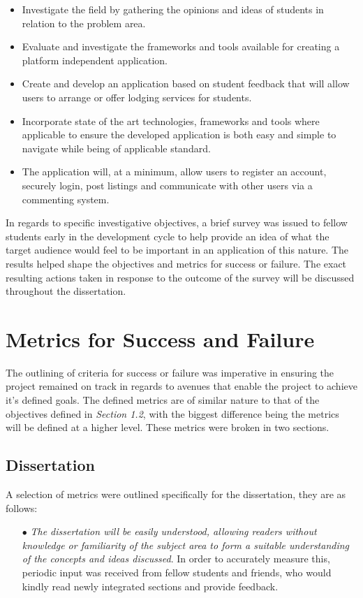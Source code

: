 \begin{itemize}
    \item Investigate the field by gathering the opinions and ideas of students in relation to the problem area.
    \item Evaluate and investigate the frameworks and tools available for creating a platform independent application.
    \item Create and develop an application based on student feedback that will allow users to arrange or offer lodging services for students.
    \item Incorporate state of the art technologies, frameworks and tools where applicable to ensure the developed application is both easy and simple to navigate while being of applicable standard.
    \item The application will, at a minimum, allow users to register an account, securely login, post listings and communicate with other users via a commenting system.
\end{itemize}

In regards to specific investigative objectives, a brief survey \cite{SURVEY} was issued to fellow students early in the development cycle to help provide an idea of what the target audience would feel to be important in an application of this nature. The results helped shape the objectives and metrics for success or failure. The exact resulting actions taken in response to the outcome of the survey will be discussed throughout the dissertation.

\section{Metrics for Success and Failure}
The outlining of criteria for success or failure was imperative in ensuring the project remained on track in regards to avenues that enable the project to achieve it's defined goals. The defined metrics are of similar nature to that of the objectives defined in \textit{Section 1.2}, with the biggest difference being the metrics will be defined at a higher level. These metrics were broken in two sections.

\subsection{Dissertation}
A selection of metrics were outlined specifically for the dissertation, they are as follows: 

\begin{itemize}
  \item[$\bullet$] \textit{The dissertation will be easily understood, allowing readers without knowledge or familiarity of the subject area to form a suitable understanding of the concepts and ideas discussed}. In order to accurately measure this, periodic input was received from fellow students and friends, who would kindly read newly integrated sections and provide feedback.
\end{itemize}

